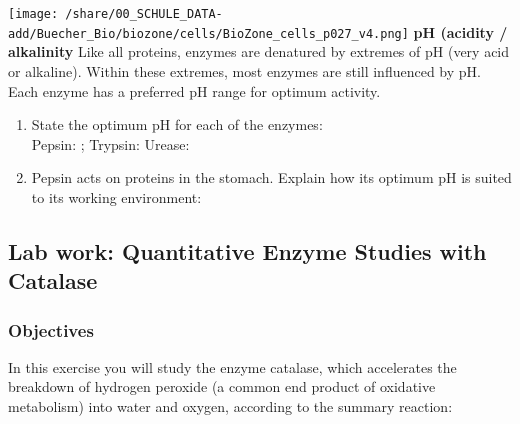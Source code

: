 \begin{enumerate}[itemsep=1.5em, leftmargin=*]
\vspace{1cm}
\hspace{-3cm}
\begin{minipage}{15cm}
\begin{multicols*}{2}
		\texttt{[image: /share/00\_SCHULE\_DATA-add/Buecher\_Bio/biozone/cells/BioZone\_cells\_p027\_v4.png]}
	\vfill\null
	\columnbreak
		 \textbf{pH (acidity / alkalinity}
		 Like all proteins, enzymes are denatured by extremes of pH (very acid or alkaline). Within these extremes, most enzymes are still influenced by pH. Each enzyme has a preferred pH range for optimum activity.
	 		\begin{enumerate}[label=\textit{(\arabic*)},leftmargin=0em,series=zaehler]
		      \item  State the optimum pH for each of the enzymes: \\
			      Pepsin: ; Trypsin:  Urease: 
		      \item Pepsin acts on proteins in the stomach. Explain how its optimum pH is suited to its working environment:
		      \end{enumerate}
	\end{multicols*}
\end{minipage}
				
				
								
				\end{enumerate}
	
		
% 



\clearpage
\subsection{Lab work: Quantitative Enzyme Studies with Catalase}

\subsubsection*{Objectives}
In this exercise you will study the enzyme catalase, which accelerates the breakdown of hydrogen peroxide (a common end product of oxidative metabolism) into water and oxygen, according to the summary reaction:

